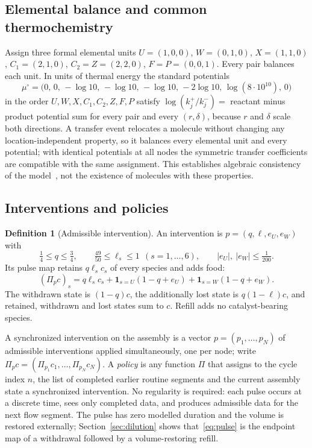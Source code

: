 \documentclass[11pt,a4paper]{article}
\theoremstyle{plain}
\theoremstyle{definition}
\newtheorem{definition}[theorem]{Definition}
\theoremstyle{remark}
\newcommand{\Pulse}{\Pi}
\begin{document}
\subsection{Elemental balance and common thermochemistry}\label{sec:thermo}
Assign three formal elemental units $U=(1,0,0)$, $W=(0,1,0)$, $X=(1,1,0)$, $C_1=(2,1,0)$, $C_2=Z=(2,2,0)$, $F=P=(0,0,1)$. Every pair balances each unit. In units of thermal energy the standard potentials
\begin{equation}\label{eq:potential}
\mu^\circ=\bigl(0,\,0,\,-\log10,\,-\log10,\,-\log10,\,-2\log10,\,\log(8\cdot10^{10}),\,0\bigr)
\end{equation}
in the order $U,W,X,C_1,C_2,Z,F,P$ satisfy $\log(k_j^+/k_j^-)=$ reactant minus product potential sum for every pair and every $(r,\delta)$, because $r$ and $\delta$ scale both directions. A transfer event relocates a molecule without changing any location-independent property, so it balances every elemental unit and every potential; with identical potentials at all nodes the symmetric transfer coefficients are compatible with the same assignment. This establishes algebraic consistency of the model~\citep{thermo2026}, not the existence of molecules with these properties.

\subsection{Interventions and policies}\label{sec:pulse}
\begin{definition}[Admissible intervention]\label{def:pulse}
An intervention is $p=(q,\ell,e_U,e_W)$ with
\begin{equation}\label{eq:pulsebounds}
\tfrac14\le q\le\tfrac34,\qquad \tfrac{49}{50}\le\ell_s\le1\ \ (s=1,\dots,6),\qquad |e_U|,\ |e_W|\le\tfrac1{200}.
\end{equation}
Its pulse map retains $q\ell_sc_s$ of every species and adds food:
\begin{equation}\label{eq:pulse}
(\Pulse_pc)_s=q\ell_sc_s+\mathbf 1_{s=U}(1-q+e_U)+\mathbf 1_{s=W}(1-q+e_W).
\end{equation}
The withdrawn state is $(1-q)c$, the additionally lost state is $q(1-\ell)c$, and retained, withdrawn and lost states sum to $c$. Refill adds no catalyst-bearing species.
\end{definition}
A synchronized intervention on the assembly is a vector $p=(p_1,\dots,p_N)$ of admissible interventions applied simultaneously, one per node; write $\Pulse_pc=(\Pulse_{p_1}c_1,\dots,\Pulse_{p_N}c_N)$. A \emph{policy} is any function $\Pi$ that assigns to the cycle index $n$, the list of completed earlier routine segments and the current assembly state a synchronized intervention. No regularity is required: each pulse occurs at a discrete time, sees only completed data, and produces admissible data for the next flow segment. The pulse has zero modelled duration and the volume is restored externally; Section~\ref{sec:dilution} shows that~\eqref{eq:pulse} is the endpoint map of a withdrawal followed by a volume-restoring refill.
\end{document}
